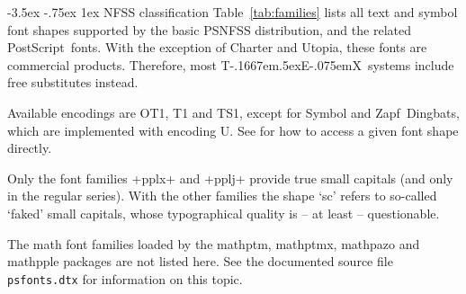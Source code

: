 \documentclass[11pt]{ltxguide}[1995/11/28]
\makeatletter
\renewcommand\section{\@startsection{section}{1}{\z@}%
{-3.5ex \@plus -.75ex}%
{1ex}%
{\normalfont\Large\bfseries}}
\def\ptmTeX{T\kern-.1667em\lower.5ex\hbox{E}\kern-.075emX\@}
\let\TeX=\ptmTeX
\newcommand{\ps}{PostScript}
\newcommand{\Lpack}[1]{\textsf{#1}}
\makeatother
\begin{document}
\section{NFSS classification}
Table~\vref{tab:families} lists all text and symbol font shapes
supported by the basic PSNFSS distribution,
and the related \ps\ fonts.
With the exception of Charter and Utopia, these fonts are commercial products.
Therefore, most \TeX\ systems include free substitutes instead.

Available encodings are OT1, T1 and TS1, except for
Symbol and Zapf~Dingbats, which are implemented with encoding U.
See \cite{fntguide} for how to access a given font shape directly.

Only the font families +pplx+ and +pplj+ provide true small capitals
(and only in the regular series).
With the other families the shape `sc' refers to so-called `faked' small capitals,
whose typographical quality is -- at least -- questionable.

The math font families loaded by the
\Lpack{mathptm}, \Lpack{mathptmx}, \Lpack{mathpazo} and \Lpack{mathpple} packages
are not listed here.
See the documented source file \texttt{psfonts.dtx}
for information on this topic.
\end{document}
